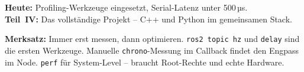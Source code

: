 \begin{projektBox}
\textbf{Heute:} Profiling-Werkzeuge eingesetzt, Serial-Latenz unter 500\,µs.\\
\textbf{Teil~IV:} Das vollständige Projekt -- C++ und Python im gemeinsamen Stack.
\end{projektBox}

\begin{merksatzBox}
\textbf{Merksatz:}
Immer erst messen, dann optimieren.
\texttt{ros2 topic hz} und \texttt{delay} sind die ersten Werkzeuge.
Manuelle \texttt{chrono}-Messung im Callback findet den Engpass im Node.
\texttt{perf} für System-Level -- braucht Root-Rechte und echte Hardware.
\end{merksatzBox}
